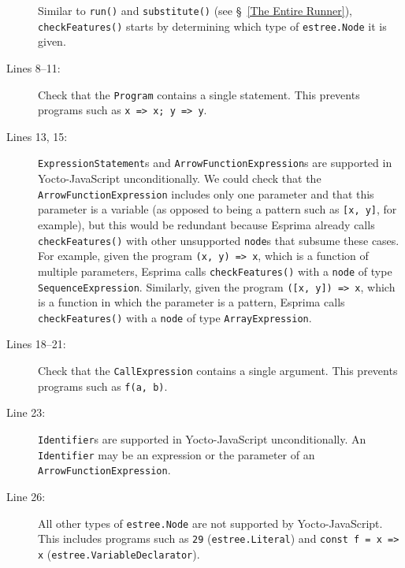 \documentclass[12pt, oneside]{book}
\begin{document}
\begin{description}
Similar to \texttt{run()} and \texttt{substitute()} (see §~\ref{The Entire Runner}), \texttt{checkFeatures()} starts by determining which type of \texttt{estree.Node} it is given.

\item [Lines 8–11:]

Check that the \texttt{Program} contains a single statement. This prevents programs such as \texttt{x => x; y => y}.

\item [Lines 13, 15:]

\texttt{ExpressionStatement}s and \texttt{ArrowFunctionExpression}s are supported in Yocto-JavaScript unconditionally. We could check that the \texttt{ArrowFunctionExpression} includes only one parameter and that this parameter is a variable (as opposed to being a pattern such as \texttt{[x, y]}, for example), but this would be redundant because Esprima already calls \texttt{checkFeatures()} with other unsupported \texttt{node}s that subsume these cases. For example, given the program \texttt{(x, y) => x}, which is a function of multiple parameters, Esprima calls \texttt{checkFeatures()} with a \texttt{node} of type \texttt{SequenceExpression}. Similarly, given the program \texttt{([x, y]) => x}, which is a function in which the parameter is a pattern, Esprima calls \texttt{checkFeatures()} with a \texttt{node} of type \texttt{ArrayExpression}.

\item [Lines 18–21:]

Check that the \texttt{CallExpression} contains a single argument. This prevents programs such as \texttt{f(a, b)}.

\item [Line 23:]

\texttt{Identifier}s are supported in Yocto-JavaScript unconditionally. An \texttt{Identifier} may be an expression or the parameter of an \texttt{ArrowFunctionExpression}.

\item [Line 26:]

All other types of \texttt{estree.Node} are not supported by Yocto-JavaScript. This includes programs such as \texttt{29} (\texttt{estree.Literal}) and \texttt{const f = x => x} (\texttt{estree.VariableDeclarator}).
\end{description}
\end{document}
